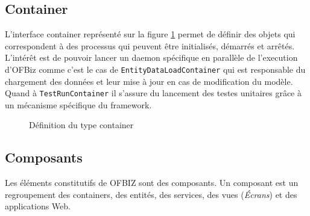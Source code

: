 \subsection{Container}
L'interface container représenté sur la figure \ref{container} permet de définir des objets qui correspondent à des processus qui peuvent être initialisés, démarrés et arrêtés. L'intérêt est de pouvoir lancer un daemon spécifique en parallèle de l'execution d'OFBiz comme c'est le cas de \verb|EntityDataLoadContainer| qui est responsable du chargement des données et leur mise à jour en cas de modification du modèle. Quand à \verb|TestRunContainer| il s'assure du lancement des testes unitaires grâce à un mécanisme spécifique du framework. 
\begin{figure}
	\centering
	
	
	\caption{Définition du type container}
	\label{container}
\end{figure}
\subsection{Composants}
Les éléments constitutifs de OFBIZ sont des composants. Un composant est un regroupement des containers, des entités, des services, des vues (\emph{Écrans}) et des applications Web.


